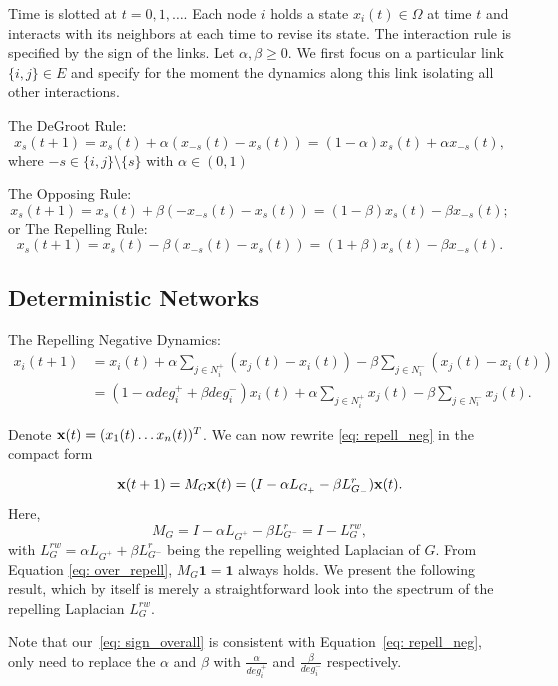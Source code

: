 Time is slotted at \(t = 0, 1, \ldots\). 
Each node \(i\) holds a state \(x_i(t) \in \Omega\) at time \(t\) and interacts with its neighbors at each time to revise its state. 
The interaction rule is specified by the sign of the links. 
Let \(\alpha, \beta \geq 0\). 
We first focus on a particular link \(\{i, j\} \in E\) and specify for the moment the dynamics along this link isolating all other interactions.

The DeGroot Rule:
\begin{equation}
    x_s(t + 1) = x_s(t) + \alpha(x_{-s}(t) - x_s(t)) = (1 - \alpha)x_s(t) + \alpha x_{-s}(t),
\end{equation}
where \(-s \in \{i, j\} \setminus \{s\}\) with \(\alpha \in (0, 1)\)

The Opposing Rule:
\begin{equation}
    x_s(t + 1) = x_s(t) + \beta(-x_{-s}(t) - x_s(t)) = (1 - \beta)x_s(t) - \beta x_{-s}(t);
\end{equation}
or
The Repelling Rule:
\begin{equation}
    x_s(t + 1) = x_s(t) - \beta(x_{-s}(t) - x_s(t)) = (1 + \beta)x_s(t) - \beta x_{-s}(t).
\end{equation}



\subsection{Deterministic Networks}

The Repelling Negative Dynamics:
\begin{equation}
\label{eq: repell_neg}
\begin{split}
    x_i(t + 1) &= x_i(t) + \alpha \sum_{j \in N_i^+} (x_j(t) - x_i(t)) - \beta \sum_{j \in N_i^-} (x_j(t) - x_i(t)) \\
    &= (1 - \alpha deg_i^+ + \beta deg_i^-)x_i(t) + \alpha \sum_{j \in N_i^+} x_j(t) - \beta \sum_{j \in N_i^-} x_j(t).
\end{split}
\end{equation}

Denote \(\bold{x}(t) = (x_1(t) \ldots x_n(t))^T\). We can now rewrite \ref{eq: repell_neg} in the compact form

\begin{equation}
\label{eq: over_repell}
\bold{x}(t + 1) = M_{G} \bold{x}(t) = (I - \alpha L_{G_+} - \beta L_{G_-}^r)\bold{x}(t).
\end{equation}
Here,
\begin{equation}
    M_G = I - \alpha L_{G^+} - \beta L_{G^-}^r = I - L_{G}^{rw},
\end{equation}
with \(L_{G}^{rw} = \alpha L_{G^+} + \beta L_{G^-}^r\) being the repelling weighted Laplacian of \(G\). 
From Equation \ref{eq: over_repell}, \(M_G \mathbf{1} = \mathbf{1}\) always holds. 
We present the following result, which by itself is merely a straightforward look into the spectrum of the repelling Laplacian \(L_{G}^{rw}\).

Note that our~\eqref{eq: sign_overall} is consistent with Equation~\eqref{eq: repell_neg}, only need to replace the $\alpha$ and $\beta$ with $\frac{\alpha}{deg_i^+}$ and $\frac{\beta}{deg_i^-}$ respectively.

